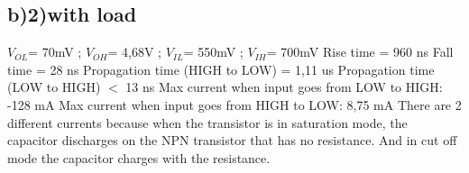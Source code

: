 \subsection*{b)2)with load} 

$V_{OL}$= 70mV ; 
$V_{OH}$= 4,68V ; 
$V_{IL}$= 550mV ;
$V_{IH}$= 700mV
\newline
Rise time = 960 ns
\newline
Fall time = 28 ns
\newline
Propagation time (HIGH to LOW) = 1,11 us
\newline
Propagation time (LOW to HIGH) $<$ 13 ns
\newline
Max current when input goes from LOW to HIGH: -128 mA
\newline
Max current when input goes from HIGH to LOW: 8,75 mA
\newline
There are 2 different currents because when the transistor
 is in saturation mode, the capacitor discharges on the 
 NPN transistor that has no resistance. And in cut off
  mode the capacitor charges with the resistance.

